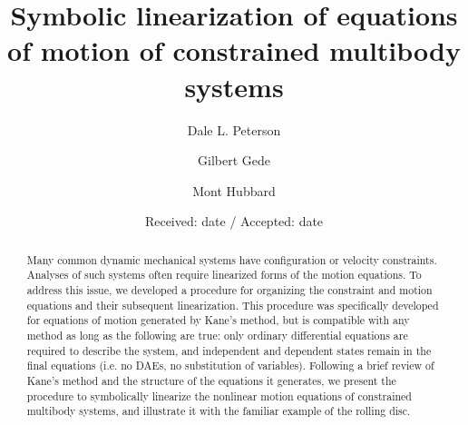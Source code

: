 \documentclass[smallcondensed,final]{svjour3}                     %
\begin{document}
\title{Symbolic linearization of equations of motion of constrained multibody systems}


\author{Dale L. Peterson\and Gilbert Gede\and Mont Hubbard}


\date{Received: date / Accepted: date}

\maketitle

\begin{abstract}
Many common dynamic mechanical systems have configuration or velocity constraints.
Analyses of such systems often require linearized forms of the motion
equations.
To address this issue, we developed a procedure for organizing the constraint
and motion equations and their subsequent linearization.
This procedure was specifically developed for equations of motion generated by
Kane's method, but is compatible with any method as long as the following are
true: only ordinary differential equations are required to describe the system,
and independent and dependent states remain in the final equations (i.e. no
DAEs, no substitution of variables).
Following a brief review of Kane's method and the structure of the equations it
generates, we present the procedure to symbolically linearize the nonlinear
motion equations of constrained multibody systems, and illustrate it with the
familiar example of the rolling disc.


\end{abstract}
\end{document}
